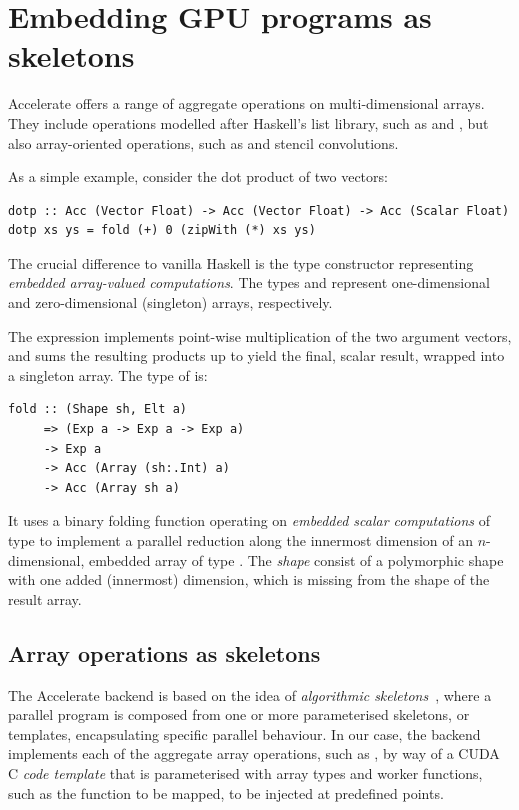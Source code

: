 \section{Embedding GPU programs as skeletons}
\label{sec:code_generation}

Accelerate offers a range of aggregate operations on multi-dimensional arrays.
They include operations modelled after Haskell's list library, such as
 and , but also array-oriented operations, such as
 and stencil convolutions.

As a simple example, consider the dot product of two vectors:
%
\begin{lstlisting}[style=haskell]
dotp :: Acc (Vector Float) -> Acc (Vector Float) -> Acc (Scalar Float)
dotp xs ys = fold (+) 0 (zipWith (*) xs ys)
\end{lstlisting}
%
The crucial difference to vanilla Haskell is the  type constructor
representing \emph{embedded array-valued computations}. The types
 and  represent one-dimensional and
zero-dimensional (singleton) arrays, respectively.

The expression  implements point-wise multiplication of
the two argument vectors, and  sums the resulting products up
to yield the final, scalar result, wrapped into a singleton array. The type of
 is:
%
\begin{lstlisting}[style=haskell]
fold :: (Shape sh, Elt a)
     => (Exp a -> Exp a -> Exp a)
     -> Exp a
     -> Acc (Array (sh:.Int) a)
     -> Acc (Array sh a)
\end{lstlisting}
%
It uses a binary folding function operating on \emph{embedded scalar
computations} of type  to implement a parallel reduction along the
innermost dimension of an $n$-dimensional, embedded array of type . The \emph{shape}  consist of a polymorphic shape
 with one added (innermost) dimension, which is missing from the shape
of the result array.


\subsection{Array operations as skeletons}

The Accelerate \CUDA backend is based on the idea of \emph{algorithmic
skeletons}~\cite{Cole:1989vr}, where a parallel program is composed from one or
more parameterised skeletons, or templates, encapsulating specific parallel
behaviour. In our case, the backend implements each of the aggregate array
operations, such as , by way of a CUDA C \emph{code template} that is
parameterised with array types and worker functions, such as the function to be
mapped, to be injected at predefined points.

